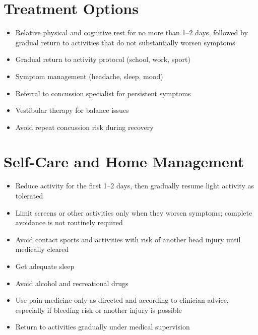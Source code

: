\section*{Treatment Options}
\begin{itemize}
 \item Relative physical and cognitive rest for no more than 1--2 days, followed by gradual return to activities that do not substantially worsen symptoms
\item Gradual return to activity protocol (school, work, sport)
\item Symptom management (headache, sleep, mood)
\item Referral to concussion specialist for persistent symptoms
\item Vestibular therapy for balance issues
\item Avoid repeat concussion risk during recovery
\end{itemize}
\section*{Self-Care and Home Management}
\begin{itemize}
 \item Reduce activity for the first 1--2 days, then gradually resume light activity as tolerated
 \item Limit screens or other activities only when they worsen symptoms; complete avoidance is not routinely required
 \item Avoid contact sports and activities with risk of another head injury until medically cleared
\item Get adequate sleep
\item Avoid alcohol and recreational drugs
 \item Use pain medicine only as directed and according to clinician advice, especially if bleeding risk or another injury is possible
\item Return to activities gradually under medical supervision
\end{itemize}

